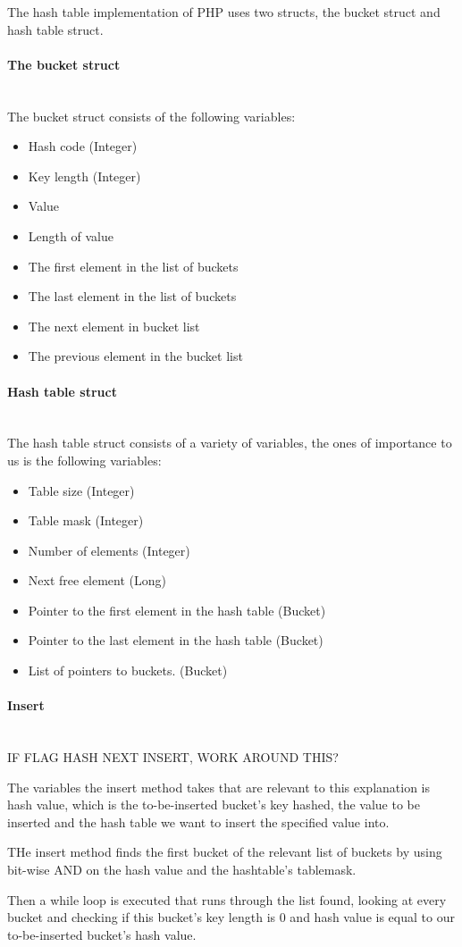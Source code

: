 \documentclass[titlepage]{article}
\newcommand{\myparagraph}[1]{\paragraph{#1}\mbox{}\\}
\begin{document}
	The hash table implementation of PHP uses two structs, the bucket struct and hash table struct.
	
	\myparagraph{The bucket struct}
	The bucket struct consists of the following variables:
	\begin{itemize}
		\item Hash code (Integer)
		\item Key length (Integer)
		\item Value
		\item Length of value
		\item The first element in the list of buckets
		\item The last element in the list of buckets
		\item The next element in bucket list
		\item The previous element in the bucket list
	\end{itemize}	
	
	
	
	\myparagraph{Hash table struct}
	The hash table struct consists of a variety of variables, the ones of importance to us is the following variables:
	\begin{itemize}
		\item Table size (Integer)
		\item Table mask (Integer)
		\item Number of elements (Integer)
		\item Next free element (Long)
		\item Pointer to the first element in the hash table (Bucket)
		\item Pointer to the last element in the hash table (Bucket)
		\item List of pointers to buckets. (Bucket)
	\end{itemize} 
	
	
	\myparagraph{Insert}
	IF FLAG HASH NEXT INSERT, WORK AROUND THIS?
	
	The variables the insert method takes that are relevant to this explanation is  hash value, which is the to-be-inserted bucket's key hashed, the value to be inserted and the hash table we want to insert the specified value into.
	
	THe insert method finds the first bucket of the relevant list of buckets by using bit-wise AND on the hash value and the hashtable's tablemask. 
	
	Then a while loop is executed that runs through the list found, looking at every bucket and checking if this bucket's key length is 0 and hash value is equal to our to-be-inserted bucket's hash value.   
	
\end{document}

